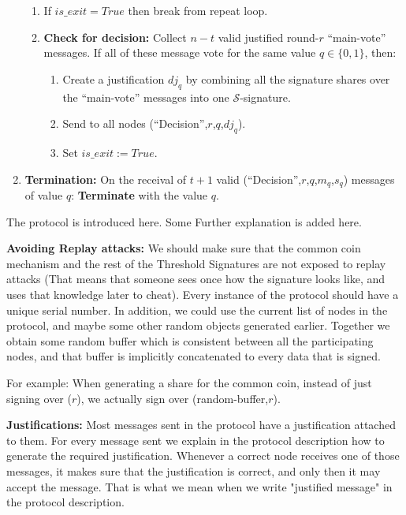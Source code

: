 \begin{algorithm}
\begin{enumerate}
\begin{enumerate}
        \item If $is\_exit = True$ then break from repeat loop.

        \item \textbf{Check for decision:} Collect $n-t$ valid justified
          round-$r$ ``main-vote'' messages. If all of these message vote for the
          same value $q \in \{0,1\}$, then:
          \begin{enumerate}
            \item Create a justification ${dj}_q$ by combining all the signature
              shares over the ``main-vote'' messages into one
              $\mathcal{S}$-signature. 
            \item Send to all nodes (``Decision'',$r$,$q$,${dj}_q$).
            \item Set $is\_exit := True$.
          \end{enumerate}

      \end{enumerate}
      \item \textbf{Termination:} On the receival of $t+1$ valid
        (``Decision'',$r$,$q$,$m_q$,$s_q$) messages of value $q$:
        \textbf{Terminate} with the value $q$.
    \end{enumerate}
\end{algorithm}

The protocol is introduced here. Some Further explanation is added here.

\textbf{Avoiding Replay attacks:} We should make sure that the common coin
mechanism and the rest of the Threshold Signatures are not exposed to replay
attacks (That means that someone sees once how the signature looks like, and
uses that knowledge later to cheat). Every instance of the protocol should have
a unique serial number. In addition, we could use the current list of nodes in
the protocol, and maybe some other random objects generated earlier. Together we
obtain some random buffer which is consistent between all the participating
nodes, and that buffer is implicitly concatenated to every data that is signed.

For example: When generating a share for the common coin, instead of just
signing over ($r$), we actually sign over (random-buffer,$r$).

\textbf{Justifications:} Most messages sent in the protocol have a justification
attached to them. For every message sent we explain in the protocol description
how to generate the required justification. Whenever a correct node receives one
of those messages, it makes sure that the justification is correct, and only
then it may accept the message. That is what we mean when we write "justified
message" in the protocol description.

